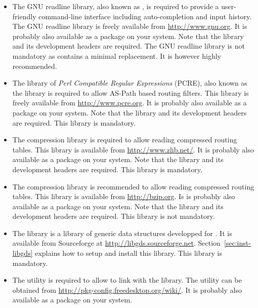 \begin{itemize}
\item The GNU readline library, also known as
  , is required to provide a user-friendly
  command-line interface including auto-completion and input
  history. The GNU readline library is freely available from
  \url{http://www.gnu.org}. It is probably also available as a package
  on your system. Note that the library and its development
  headers are required. The GNU readline library is not mandatory as
   contains a minimal replacement. It is however
  highly recommended.

\item The library of {\it Perl Compatible Regular Expressions} (PCRE),
  also known as the  library is required to allow
  AS-Path based routing filters. This library is freely available from
  \url{http://www.pcre.org}. It is probably also available as a
  package on your system. Note that the library and its development
  headers are required. This library is mandatory.

\item The  compression library is required to allow
  reading compressed routing tables. This library is available from
  \url{http://www.zlib.net/}. It is probably also available as a
  package on your system. Note that the library and its development
  headers are required. This library is mandatory.

\item The  compression library is recommended to
  allow reading compressed routing tables. This library is available
  from \url{http://bzip.org}. Is is probably also available as a
  package on your system. Note that the library and its development
  headers are required. This library is not mandatory.

\item The  library is a library of generic data
  structures developped for . It is available from
  Sourceforge at
  \url{http://libgds.sourceforge.net}. Section~\ref{sec:inst-libgds}
  explains how to setup and install this library. This library is
  mandatory.

\item The  utility is required to allow
   to link with the 
  library. The  utility can be obtained from
  \url{http://pkg-config.freedesktop.org/wiki/}. It is probably also
  available as a package on your system.

\end{itemize}

